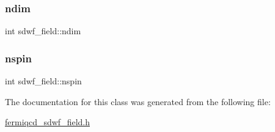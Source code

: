 \mbox{\label{classsdwf__field_a5a861ccb2b42b333b5d67e3b501e8533}} 
\subsubsection{\texorpdfstring{ndim}{ndim}}
{\footnotesize\ttfamily int sdwf\+\_\+field\+::ndim}

\mbox{\label{classsdwf__field_a6269e653489fd6ee9340da498187b132}} 
\subsubsection{\texorpdfstring{nspin}{nspin}}
{\footnotesize\ttfamily int sdwf\+\_\+field\+::nspin}



The documentation for this class was generated from the following file\+:\begin{DoxyCompactItemize}
\item 
\hyperlink{fermiqcd__sdwf__field_8h}{fermiqcd\+\_\+sdwf\+\_\+field.\+h}\end{DoxyCompactItemize}
